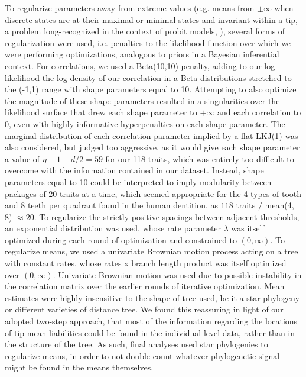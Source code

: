 \documentclass[12pt, twocolumn, twoside]{article}
\begin{document}
To regularize parameters away from extreme values (e.g. means from $\pm\infty$ when discrete states are at their maximal or minimal states and invariant within a tip, a problem long-recognized in the context of probit models, \citealt{fisherCaseZeroSurvivors1935}), several forms of regularization were used, i.e. penalties to the likelihood function over which we were performing optimizations, analogous to priors in a Bayesian inferential context. For correlations, we used a Beta(10,10) penalty, adding to our log-likelihood the log-density of our correlation in a Beta distributions stretched to the (-1,1) range with shape parameters equal to 10. Attempting to also optimize the magnitude of these shape parameters resulted in a singularities over the likelihood surface that drew each shape parameter to $+\infty$ and each correlation to 0, even with highly informative hyperpenalties on each shape parameter. The marginal distribution of each correlation parameter implied by a flat LKJ(1) was also considered, but judged too aggressive, as it would give each shape parameter a value of $\eta - 1 + d / 2 = 59$ for our 118 traits, which was entirely too difficult to overcome with the information contained in our dataset. Instead, shape parameters equal to 10 could be interpreted to imply modularity between packages of 20 traits at a time, which seemed appropriate for the 4 types of tooth and 8 teeth per quadrant found in the human dentition, as $118$ traits $/$ mean(4, 8) $\approx 20$. To regularize the strictly positive spacings between adjacent thresholds, an exponential distribution was used, whose rate parameter $\lambda$ was itself optimized during each round of optimization and constrained to $(0, \infty)$. To regularize means, we used a univariate Brownian motion process acting on a tree with constant rates, whose rates x branch length product was itself optimized over $(0, \infty)$. Univariate Brownian motion was used due to possible instability in the correlation matrix over the earlier rounds of iterative optimization. Mean estimates were highly insensitive to the shape of tree used, be it a star phylogeny or different varieties of distance tree. We found this reassuring in light of our adopted two-step approach, that most of the information regarding the locations of tip mean liabilities could be found in the individual-level data, rather than in the structure of the tree. As such, final analyses used star phylogenies to regularize means, in order to not double-count whatever phylogenetic signal might be found in the means themselves.
\end{document}
